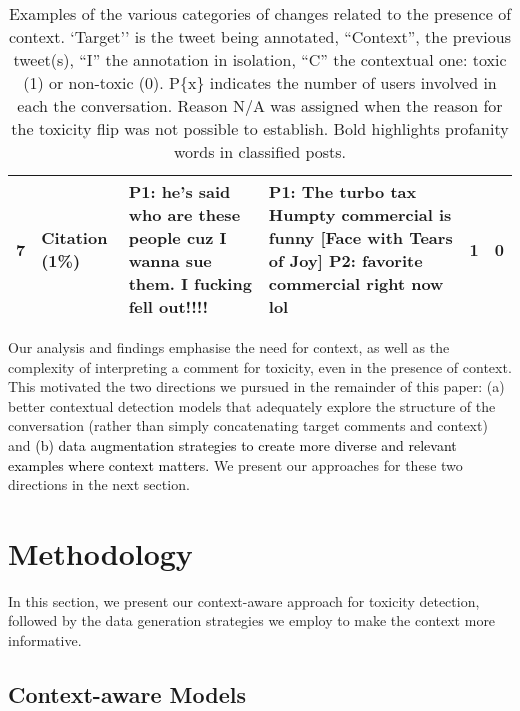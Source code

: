 \documentclass[acmsmall]{acmart}
\newcommand{\red}[1]{\textcolor{black}{#1}}
\begin{document}
\begin{table*}[]
\begin{footnotesize}
\begin{tabular}{p{0.05cm}|l|p{4.5cm}|p{4.5cm}|p{0.05cm}|p{0.05cm}}
7 & Citation (1\%) & P1: he's said who are these people cuz I wanna sue them. I \textbf{fucking} fell out!!!!  & P1: The turbo tax Humpty commercial is funny [Face with Tears of Joy] \newline P2: favorite commercial right now lol  & 1 & 0 \\ 
\bottomrule
\end{tabular}
\end{footnotesize}
\caption{\label{reasons-table} Examples of the various categories of changes related to the presence of context. `Target'' is the tweet being annotated,  ``Context'',  the previous tweet(s), ``I'' the annotation in isolation, ``C'' the contextual one: toxic (1) or non-toxic (0). P\{x\} indicates the number of users involved in each the conversation. Reason N/A was assigned when the reason for the toxicity flip was not possible to establish. Bold highlights profanity words in classified posts.}
\end{table*}

Our analysis and findings emphasise the need for context, as well as the complexity of interpreting a comment for toxicity, even in the presence of context. This motivated the two directions we pursued in the remainder of this paper: (a) better contextual detection models that adequately explore the structure of the conversation (rather than simply concatenating target comments and context) and \red{(b) data augmentation strategies to  create more diverse and relevant examples where context matters.} We present our approaches for these two directions in the next section.

\section{Methodology} \label{section:methodology}

In this section, we present our context-aware approach for toxicity detection, followed by the data generation strategies we employ to make the context more informative.   

\subsection{Context-aware Models}\label{subsec:models}
\end{document}
